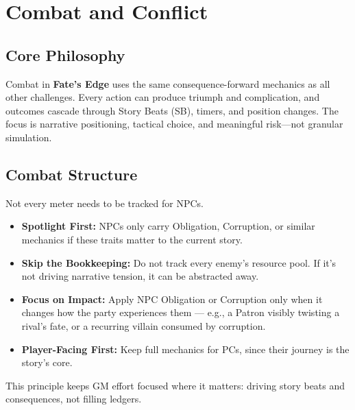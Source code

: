 
\chapter{Combat and Conflict}\label{chap:combat_conflict}

\section{Core Philosophy}\label{sec:combat_philosophy}

Combat in \textbf{Fate's Edge} uses the same consequence-forward mechanics as all other challenges. Every action can produce triumph and complication, and outcomes cascade through Story Beats (SB), timers, and position changes. The focus is narrative positioning, tactical choice, and meaningful risk---not granular simulation.

\section{Combat Structure}\label{sec:combat_structure}

\begin{tcolorbox}[title={Tracking NPC Mechanics},colback=red!5!white,colframe=red!75!black,sharp corners,breakable]
Not every meter needs to be tracked for NPCs.
\begin{itemize}
    \item \textbf{Spotlight First:} NPCs only carry Obligation, Corruption, or similar mechanics if these traits matter to the current story.
    \item \textbf{Skip the Bookkeeping:} Do not track every enemy's resource pool. If it's not driving narrative tension, it can be abstracted away.
    \item \textbf{Focus on Impact:} Apply NPC Obligation or Corruption only when it changes how the party experiences them --- e.g., a Patron visibly twisting a rival's fate, or a recurring villain consumed by corruption.
    \item \textbf{Player-Facing First:} Keep full mechanics for PCs, since their journey is the story's core.
\end{itemize}
This principle keeps GM effort focused where it matters: driving story beats and consequences, not filling ledgers.
\end{tcolorbox}

